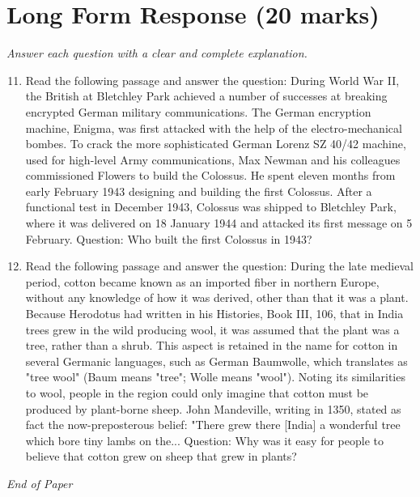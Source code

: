 \documentclass[12pt]{article}
\begin{document}
\section*{Long Form Response (20 marks)}
\textit{Answer each question with a clear and complete explanation.}
\begin{enumerate}[label=\arabic*.]
\setcounter{enumi}{10}
\item Read the following passage and answer the question: During World War II, the British at Bletchley Park achieved a number of successes at breaking encrypted German military communications. The German encryption machine, Enigma, was first attacked with the help of the electro-mechanical bombes. To crack the more sophisticated German Lorenz SZ 40/42 machine, used for high-level Army communications, Max Newman and his colleagues commissioned Flowers to build the Colossus. He spent eleven months from early February 1943 designing and building the first Colossus. After a functional test in December 1943, Colossus was shipped to Bletchley Park, where it was delivered on 18 January 1944 and attacked its first message on 5 February. Question: Who built the first Colossus in 1943?
\item Read the following passage and answer the question: During the late medieval period, cotton became known as an imported fiber in northern Europe, without any knowledge of how it was derived, other than that it was a plant. Because Herodotus had written in his Histories, Book III, 106, that in India trees grew in the wild producing wool, it was assumed that the plant was a tree, rather than a shrub. This aspect is retained in the name for cotton in several Germanic languages, such as German Baumwolle, which translates as "tree wool" (Baum means "tree"; Wolle means "wool"). Noting its similarities to wool, people in the region could only imagine that cotton must be produced by plant-borne sheep. John Mandeville, writing in 1350, stated as fact the now-preposterous belief: "There grew there [India] a wonderful tree which bore tiny lambs on the... Question: Why was it easy for people to believe that cotton grew on sheep that grew in plants?
\end{enumerate}

\vfill
\noindent\textit{End of Paper}
\end{document}

